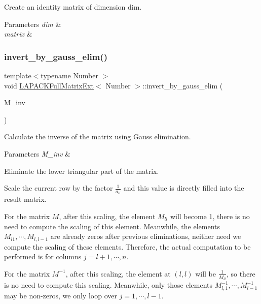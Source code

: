 Create an identity matrix of dimension {\ttfamily dim}. 
\begin{DoxyParams}{Parameters}
{\em dim} & \\
\hline
{\em matrix} & \\
\hline
\end{DoxyParams}
\mbox{\label{classLAPACKFullMatrixExt_a13bbc430a0f60d4158d1693a2d7a0235}} 
\subsubsection{\texorpdfstring{invert\+\_\+by\+\_\+gauss\+\_\+elim()}{invert\_by\_gauss\_elim()}}
{\footnotesize\ttfamily template$<$typename Number $>$ \\
void \hyperlink{classLAPACKFullMatrixExt}{L\+A\+P\+A\+C\+K\+Full\+Matrix\+Ext}$<$ Number $>$\+::invert\+\_\+by\+\_\+gauss\+\_\+elim (\begin{DoxyParamCaption}\item[{\hyperlink{classLAPACKFullMatrixExt}{L\+A\+P\+A\+C\+K\+Full\+Matrix\+Ext}$<$ Number $>$ \&}]{M\+\_\+inv }\end{DoxyParamCaption})}

Calculate the inverse of the matrix using Gauss elimination. 
\begin{DoxyParams}{Parameters}
{\em M\+\_\+inv} & \\
\hline
\end{DoxyParams}
Eliminate the lower triangular part of the matrix.

Scale the current row by the factor $\frac{1}{a_{ll}}$ and this value is directly filled into the result matrix.

For the matrix $M$, after this scaling, the element $M_{ll}$ will become 1, there is no need to compute the scaling of this element. Meanwhile, the elements $M_{l1}, \cdots, M_{l,l-1}$ are already zeros after previous eliminations, neither need we compute the scaling of these elements. Therefore, the actual computation to be performed is for columns $j = l + 1, \cdots, n$.

For the matrix $M^{-1}$, after this scaling, the element at $(l, l)$ will be $\frac{1}{M_{ll}}$, so there is no need to compute this scaling. Meanwhile, only those elements $M^{-1}_{l,1}, \cdots, M^{-1}_{l-1}$ may be non-\/zeros, we only loop over $j = 1, \cdots, l - 1$.

